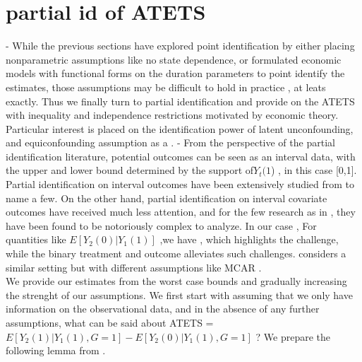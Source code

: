 \documentclass{article}
\begin{document}
\section{partial id of ATETS}
- While the previous sections have explored point identification by either placing nonparametric assumptions like no state dependence, or formulated economic models with functional forms on the duration parameters to point identify the estimates, those assumptions may be difficult to hold in practice , at leats exactly. Thus we finally turn to partial identification and provide  on the ATETS with inequality and independence restrictions motivated by economic theory. Particular interest is placed on the identification power of latent unconfounding, and equiconfounding assumption as a .
- From the perspective of the partial identification literature, potential outcomes can be seen as an interval data, with the upper and lower bound determined by the support of$ Y_t(1$) , in this case [0,1]. Partial identification on interval outcomes have been extensively studied from \cite{manski 2003, manski and tamer 2002} to name a few. On the other hand, partial identification on interval covariate outcomes have received much less attention, and for the few research as in \cite{berst molinari 2008}, they have been found to be notoriously complex to analyze. In our case , For quantities like $E[ Y _2(0) | Y_1(1) ]$ ,we have , which highlights the challenge, while the  binary treatment and outcome alleviates such challenges. \cite{manski and horowitz 2000} considers a similar setting but with different assumptions like MCAR .\\
We provide our estimates from the worst case bounds and gradually increasing the strenght of our assumptions.  We first start with assuming that we only have information on the observational data, and in the absence of any further assumptions, what can be said about ATETS = $E[ Y_2(1) | Y_1(1) , G =1 ] - E[ Y_2(0) | Y_1(1), G =1]$ ? We prepare the following lemma from \cite{manski and horowitz 2000} .
\end{document}
